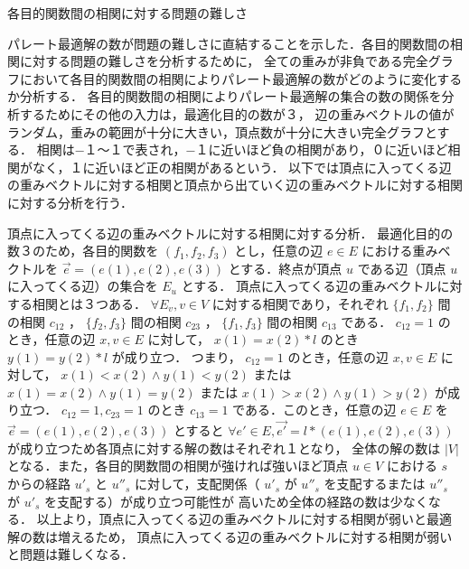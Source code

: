 \documentclass[12pt]{optlab-bachelor}
\begin{document}
\begin{description}
  \item[各目的関数間の相関に対する問題の難しさ]
\end{description}

パレート最適解の数が問題の難しさに直結することを示した．各目的関数間の相関に対する問題の難しさを分析するために，
全ての重みが非負である完全グラフにおいて各目的関数間の相関によりパレート最適解の数がどのように変化するか分析する．
各目的関数間の相関によりパレート最適解の集合の数の関係を分析するためにその他の入力は，最適化目的の数が３，
辺の重みベクトルの値がランダム，重みの範囲が十分に大きい，頂点数が十分に大きい完全グラフとする．
相関は−１〜１で表され，−１に近いほど負の相関があり，０に近いほど相関がなく，１に近いほど正の相関があるという．
以下では頂点に入ってくる辺の重みベクトルに対する相関と頂点から出ていく辺の重みベクトルに対する相関に対する分析を行う．

頂点に入ってくる辺の重みベクトルに対する相関に対する分析．
最適化目的の数３のため，各目的関数を $(f_1,f_2,f_3)$ とし，任意の辺 $e　\in E$ における重みベクトルを
 $\vec{e}=(e(1),e(2),e(3))$ とする．終点が頂点 $u$ である辺（頂点 $u$ に入ってくる辺）の集合を $E_u$ とする．
頂点に入ってくる辺の重みベクトルに対する相関とは３つある． $\forall E_v , v \in V$ に対する相関であり，それぞれ
 $\{f_1,f_2\}$ 間の相関 $c_{12}$ ， $\{f_2,f_3\}$ 間の相関 $c_{23}$ ， $\{f_1,f_3\}$ 間の相関 $c_{13}$ である．
$c_{12}=1$ のとき，任意の辺 $x,v\in E$ に対して， $x(1)=x(2)*l$ のとき $y(1)=y(2)*l$ が成り立つ．
つまり， $c_{12}=1$ のとき，任意の辺 $x,v\in E$ に対して， $x(1)<x(2) \land y(1)<y(2)$ または
 $x(1)=x(2) \land y(1)=y(2)$ または $x(1)>x(2) \land y(1)>y(2)$ が成り立つ．
$c_{12}=1,c_{23}=1$ のとき $c_{13}=1$ である．このとき，任意の辺 $e \in E$ を $\vec{e}=(e(1),e(2),e(3))$ とすると
 $\forall e'\in E,\vec{e'} = l*(e(1),e(2),e(3))$ が成り立つため各頂点に対する解の数はそれぞれ１となり，
全体の解の数は $|V|$ となる．また，各目的関数間の相関が強ければ強いほど頂点 $u\in V$ における $s$ からの経路 $u'_{s}$ と
 $u''_{s}$ に対して，支配関係（ $u'_{s}$ が $u''_{s}$ を支配するまたは $u''_{s}$ が $u'_{s}$ を支配する）が成り立つ可能性が
高いため全体の経路の数は少なくなる．
以上より，頂点に入ってくる辺の重みベクトルに対する相関が弱いと最適解の数は増えるため，
頂点に入ってくる辺の重みベクトルに対する相関が弱いと問題は難しくなる．
\end{document}
